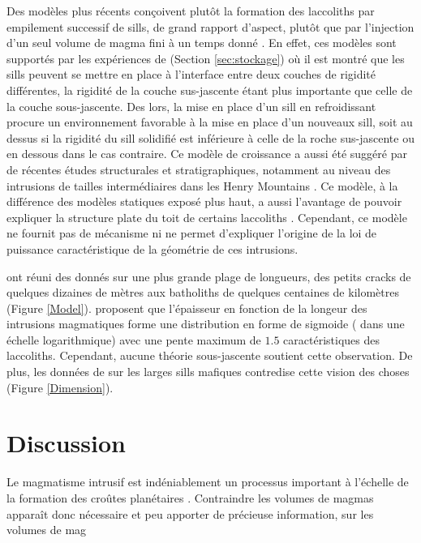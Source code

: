 Des modèles plus récents conçoivent plutôt la formation des laccoliths
par empilement successif  de sills, de grand  rapport d'aspect, plutôt
que par  l'injection d'un seul volume  de magma fini à  un temps donné
\citep{Menand:2011ki}.  En  effet, ces modèles sont  supportés par les
expériences de \citep{Kavanagh:2006ig} (Section \ref{sec:stockage}) où
il est montré  que les sills peuvent se mettre  en place à l'interface
entre deux couches  de rigidité différentes, la rigidité  de la couche
sus-jascente   étant  plus   importante   que  celle   de  la   couche
sous-jascente. Des lors,  la mise en place d'un  sill en refroidissant
procure un  environnement favorable à  la mise en place  d'un nouveaux
sill, soit au dessus si la rigidité du sill solidifié est inférieure à
celle de la roche sus-jascente ou en dessous dans le cas contraire. Ce
modèle  de croissance  a  aussi  été suggéré  par  de récentes  études
structurales et  stratigraphiques, notamment au niveau  des intrusions
de    tailles     intermédiaires    dans    les     Henry    Mountains
\citep{Horsman:2005ct,Morgan:2008hj,Horsman:2009gea,Menand:2011ki}. Ce
modèle,  à la  différence des  modèles statiques  exposé plus  haut, a
aussi l'avantage  de pouvoir expliquer  la structure plate du  toit de
certains  laccoliths \citep{Morgan:2008hj}.   Cependant, ce  modèle ne
fournit pas de mécanisme ni ne  permet d'expliquer l'origine de la loi
de puissance caractéristique de la géométrie de ces intrusions.

\citet{Nachwuchskoechin:2002tv}  ont réuni  des  donnés  sur une  plus
grande plage de  longueurs, des petits cracks de  quelques dizaines de
mètres  aux batholiths  de  quelques centaines  de kilomètres  (Figure
\ref{Model}).     \citet{Nachwuchskoechin:2002tv}     proposent    que
l'épaisseur en fonction de la longeur des intrusions magmatiques forme
une   distribution  en   forme  de   sigmoide  (   dans  une   échelle
logarithmique) avec  une pente  maximum de $1.5$  caractéristiques des
laccoliths.   Cependant, aucune  théorie sous-jascente  soutient cette
observation. De plus, les données  de \citet{Cruden:tg} sur les larges
sills   mafiques   contredise   cette  vision   des   choses   (Figure
\ref{Dimension}).

\section{Discussion}
\label{sec:discussion}

Le  magmatisme intrusif  est indéniablement  un processus  important à
l'échelle     de    la     formation    des     croûtes    planétaires
\citep{White:2006gr}.  Contraindre les volumes de magmas apparaît donc
nécessaire et peu  apporter de précieuse information,  sur les volumes
de mag

